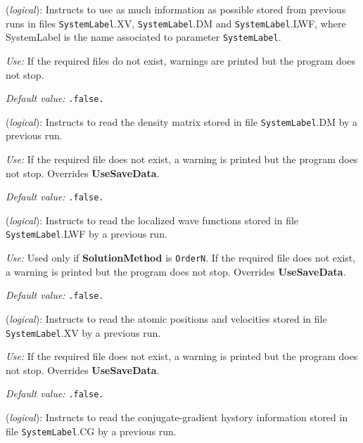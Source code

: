 \begin{description}
\itemsep 10pt
\parsep 0pt


\item[{\bf UseSaveData}] ({\it logical}): 
Instructs to use as much information as possible stored from
previous runs in files {\tt SystemLabel}.XV, {\tt SystemLabel}.DM and
{\tt SystemLabel}.LWF, where SystemLabel is the name associated
to parameter {\tt SystemLabel}.

{\it Use:} If the required files do not exist, warnings are
printed but the program does not stop.

{\it Default value:} {\tt .false.}
        

\item[{\bf DM.UseSaveDM}] ({\it logical}): 
Instructs to read the density matrix stored in file
{\tt SystemLabel}.DM by a previous run.

{\it Use:} If the required file does not exist, a warning is
printed but the program does not stop. Overrides {\bf UseSaveData}.

{\it Default value:} {\tt .false.}


\item[{\bf ON.UseSaveLWF}] ({\it logical}): 
Instructs to read the localized wave functions stored in file
{\tt SystemLabel}.LWF by a previous run.

{\it Use:} Used only if {\bf SolutionMethod} is {\tt OrderN}.
If the required file does not exist, a warning is
printed but the program does not stop. Overrides {\bf UseSaveData}.

{\it Default value:} {\tt .false.}

 
\item[{\bf MD.UseSaveXV}] ({\it logical}):
Instructs to read the atomic positions and velocities stored
in file {\tt SystemLabel}.XV by a previous run.
 
{\it Use:} If the required file does not exist, a warning is
printed but the program does not stop. Overrides {\bf UseSaveData}.
 
{\it Default value:} {\tt .false.}


\item[{\bf MD.UseSaveCG}] ({\it logical}): 
Instructs to read the conjugate-gradient hystory information stored
in file {\tt SystemLabel}.CG by a previous run.


\end{description}
